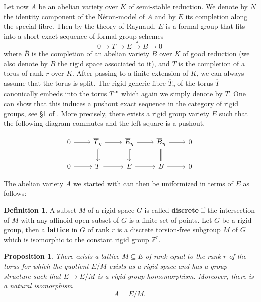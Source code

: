 \documentclass[10pt,oneside]{amsart}
\newtheorem{proposition}[theorem]{Proposition}
\theoremstyle{definition}
\newtheorem{definition}[theorem]{Definition}
\theoremstyle{remark}
\begin{document}
	Let now $A$ be an abelian variety over $K$ of semi-stable reduction. We denote by $N$ the identity component of the N\'eron-model of $A$ and by $\overline E$ its completion along the special fibre. Then by the theory of Raynaud, $\overline E$ is a formal group that fits into a short exact sequence of formal group schemes
	\begin{equation}\label{formal Raynaud extension}
	0\rightarrow \overline T \rightarrow \overline E \xrightarrow{\pi} \overline{B}\rightarrow 0
	\end{equation}
	where $\overline{B}$ is the completion of an abelian variety $B$ over $K$ of good reduction (we also denote by $B$ the rigid space associated to it), and $\overline{T}$ is the completion of a torus of rank $r$ over $K$.
	After passing to a finite extension of $K$, we can always assume that the torus is split. The rigid generic fibre $\overline{T}_\eta$ of the torus $\overline{T}$ canonically embeds into the torus $T^{\operatorname{an}}$ which again we simply denote by $T$. One can show that this induces a pushout exact sequence in the category of rigid groups, see \S 1 of \cite{BL}. More precisely, there exists a rigid group variety $E$ such that the following diagram commutes and the left square is a pushout.
	\begin{center}
		\begin{equation}
		\begin{tikzcd}
			0 \arrow[r] & \overline{T}_\eta \arrow[d, hook] \arrow[r] & \overline{E}_\eta \arrow[d, hook] \arrow[r] & \overline{B}_\eta \arrow[d,equal] \arrow[r] & 0 \\
			0 \arrow[r] & T \arrow[r] & E \arrow[r] & B \arrow[r] & 0
		\end{tikzcd}
		\end{equation}
	\end{center}
	
	The abelian variety $A$ we started with can then be uniformized in terms of $E$ as follows:
	
	\begin{definition}
		A subset $M$ of a rigid space $G$ is called \textbf{discrete} if the intersection of $M$ with any affinoid open subset of $G$ is a finite set of points.
		Let $G$ be a rigid group, then a \textbf{lattice} in $G$ of rank $r$ is a discrete torsion-free subgroup $M$ of $G$ which is isomorphic to the constant rigid group $\underline{\mathbb Z^r}$. 
	\end{definition}
	
	\begin{proposition}\label{Raynaud uniformisation}
		There exists a lattice $M \subseteq E$ of rank equal to the rank $r$ of the torus for which the quotient $E/M$ exists as a rigid space and has a group structure such that $E\rightarrow E/M$ is a rigid group homomorphism. Moreover, there is a natural isomorphism
		\[A=E/M.\]
	\end{proposition}
	
\end{document}
